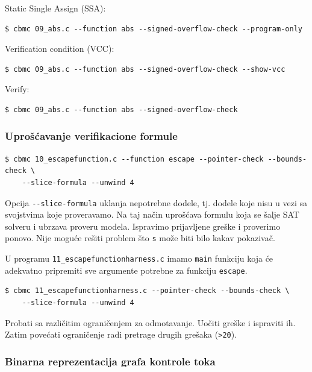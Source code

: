 Static Single Assign (SSA):

\begin{verbatim}
$ cbmc 09_abs.c --function abs --signed-overflow-check --program-only
\end{verbatim}

Verification condition (VCC):

\begin{verbatim}
$ cbmc 09_abs.c --function abs --signed-overflow-check --show-vcc
\end{verbatim}

Verify:

\begin{verbatim}
$ cbmc 09_abs.c --function abs --signed-overflow-check
\end{verbatim}

\subsubsection{Uprošćavanje verifikacione formule}\label{uproux161ux107avanje-verifikacione-formule}

\begin{verbatim}
$ cbmc 10_escapefunction.c --function escape --pointer-check --bounds-check \
    --slice-formula --unwind 4
\end{verbatim}

Opcija \texttt{-{}-slice-formula} uklanja nepotrebne dodele, tj. dodele koje nisu u vezi sa svojstvima koje proveravamo. Na taj način uprošćava formulu koja se šalje SAT solveru i ubrzava proveru modela. Ispravimo prijavljene greške i proverimo ponovo. Nije moguće rešiti problem što \texttt{s} može biti bilo kakav pokazivač.

U programu \texttt{11\_escapefunctionharness.c} imamo \texttt{main} funkciju koja će adekvatno pripremiti sve argumente potrebne za funkciju \texttt{escape}.

\begin{verbatim}
$ cbmc 11_escapefunctionharness.c --pointer-check --bounds-check \
    --slice-formula --unwind 4
\end{verbatim}

Probati sa različitim ograničenjem za odmotavanje. Uočiti greške i ispraviti ih. Zatim povećati ograničenje radi pretrage drugih grešaka (\texttt{\textgreater{}20}).

\subsubsection{Binarna reprezentacija grafa kontrole toka}\label{binarna-reprezentacija-grafa-kontrole-toka}

